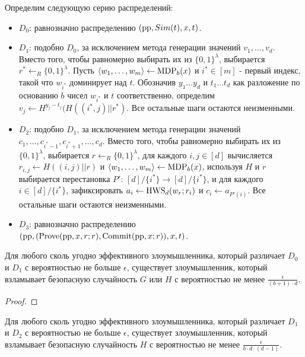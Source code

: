\begin{definition}[Распределения $D_0$, $D_1$, $D_2$ и $D_3$]
	Определим следующую серию распределений:
	\begin{itemize}
		\item $D_0$: равнозначно распределению $(\text{pp}, Sim(t), x, t)$.
		\item $D_1$: подобно $D_0$, за исключением метода генерации значений $v_1, \dots, v_d$. Вместо того, чтобы равномерно выбирать их из $\{0, 1\}^\lambda$, выбирается $r^* \leftarrow_R \{0, 1\}^\lambda$. Пусть $\langle w_1, \dots, w_m \rangle \leftarrow \text{MDP}_b(x)$ и $i^* \in [m]$ - первый индекс, такой что $w_{i^*}$ доминирует над $t$. Обозначив $y_1 \dots y_d$ и $t_1 \dots t_d$ как разложение по основанию $b$ чисел $w_{i^*}$ и $t$ соответственно, определим $v_j \leftarrow H^{y_j - t_j}(H((i^*, j) || r^*)$. Все остальные шаги остаются неизменными.
		\item $D_2$: подобно $D_1$, за исключением метода генерации значений $c_1, \dots, c_{i^* - 1}, c_{i^* + 1}, \dots, c_d$. Вместо того, чтобы равномерно выбирать их из $\{0, 1\}^\lambda$, выбирается $r \leftarrow_R \{0, 1\}^\lambda$, для каждого $i, j \in [d]$ вычисляется $r_{i, j} \leftarrow H((i, j) || r)$ и $\langle w_1, \dots, w_m \rangle \leftarrow \text{MDP}_b(x)$, используя $H$ и $r$ выбирается перестановка $P'$: $[d] / \{i^*\} \rightarrow [d] / \{i^*\}$, и для каждого $i \in [d] / \{i^*\}$, зафиксировать $a_i \leftarrow \text{HWS}_d(w_r; r_i)$ и $c_i \leftarrow a_{P'(i)}$. Все остальные шаги остаются неизменными.
		\item $D_3$: равнозначно распределению $(\text{pp}, (\text{Prove}(\text{pp}, x, r; r), \text{Commit}(\text{pp}, x; r)), x, t)$.
	\end{itemize}
\end{definition}

\begin{theorem}
	\label{lemma:10}
	Для любого сколь угодно эффективного злоумышленника, который различает $D_0$ и $D_1$ с вероятностью не больше $\epsilon$, существует злоумышленник, который взламывает безопасную случайность $G$ или $H$ с вероятностью не менее $\frac{\epsilon}{(b + 1) \cdot d}$.
\end{theorem}

\begin{proof}
\end{proof}

\begin{theorem}
	\label{lemma:11}
	Для любого сколь угодно эффективного злоумышленника, который различает $D_1$ и $D_2$ с вероятностью не больше $\epsilon$, существует злоумышленник, который взламывает безопасную случайность $H$ с вероятностью не менее $\frac{\epsilon}{b \cdot d \cdot (d - 1)}$.
\end{theorem}

